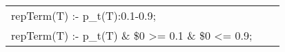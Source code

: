 \begin{tabular}{lcl}
repTerm(T) :- p\_t(T):0.1-0.9;\\
repTerm(T) :- p\_t(T) \& \$0 >= 0.1 \& \$0 <= 0.9;\\
\end{tabular}
